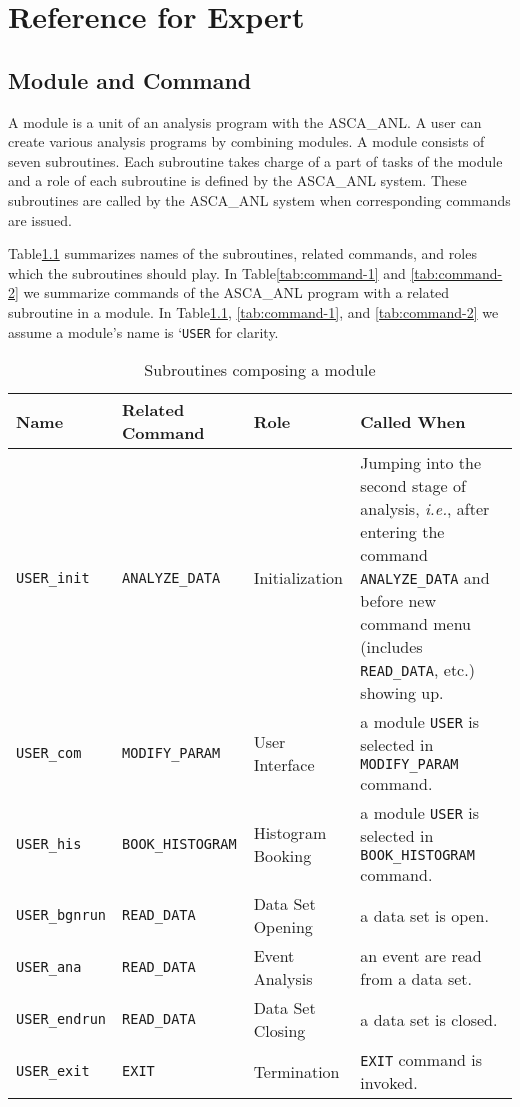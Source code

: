 \chapter{Reference for Expert}

\section{Module and Command}
A module is a unit of an analysis program with the ASCA\_ANL.
A user can create various analysis programs by combining modules.
A module consists of seven subroutines.
Each subroutine takes charge of a part of tasks of the module
and a role of each subroutine is defined by the ASCA\_ANL system.
These subroutines are called by the ASCA\_ANL system
when corresponding commands are issued.

Table\ref{tab:routines_in_module} summarizes
names of the subroutines,
related commands,
and roles which the subroutines should play.
In Table\ref{tab:command-1} and \ref{tab:command-2}
we summarize commands of the ASCA\_ANL program
with a related subroutine in a module.
In Table\ref{tab:routines_in_module},
\ref{tab:command-1}, and \ref{tab:command-2}
we assume a module's name is `{\tt USER} for clarity.

\begin{table}[hbt]
\begin{center}
\begin{tabular}{|l|l|l|p{}|}
\hline
Name & Related Command & Role & Called When \\
\hline
%
{\tt USER\_init} & {\tt ANALYZE\_DATA} & Initialization
& Jumping into the second stage of analysis,
  {\em i.e.},
  after entering the command {\tt ANALYZE\_DATA}
  and before new command menu (includes {\tt READ\_DATA}, etc.) showing up. \\
%
{\tt USER\_com} & {\tt MODIFY\_PARAM} & User Interface
& a module {\tt USER} is selected in {\tt MODIFY\_PARAM} command. \\
%
{\tt USER\_his} & {\tt BOOK\_HISTOGRAM} & Histogram Booking
& a module {\tt USER} is selected in {\tt BOOK\_HISTOGRAM} command. \\
%
{\tt USER\_bgnrun} & {\tt READ\_DATA} & Data Set Opening
& a data set is open. \\
%
{\tt USER\_ana} & {\tt READ\_DATA} & Event Analysis
& an event are read from a data set. \\
%
{\tt USER\_endrun} & {\tt READ\_DATA} & Data Set Closing
& a data set is closed. \\
%
{\tt USER\_exit} & {\tt EXIT} & Termination
& {\tt EXIT} command is invoked. \\
\hline
\end{tabular}
\caption{Subroutines composing a module}
\label{tab:routines_in_module}
\end{center}
\end{table}

